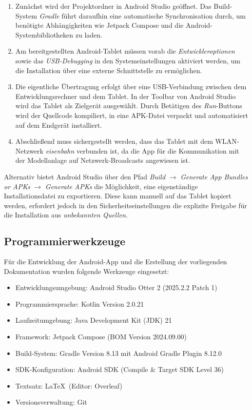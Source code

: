 \documentclass{article}
\begin{document}
\begin{enumerate}
    \item Zunächst wird der Projektordner in Android Studio geöffnet. Das Build-System \textit{Gradle} führt daraufhin eine automatische Synchronisation durch, um benötigte Abhängigkeiten wie Jetpack Compose und die Android-Systembibliotheken zu laden.
    
    \item Am bereitgestellten Android-Tablet müssen vorab die \textit{Entwickleroptionen} sowie das \textit{USB-Debugging} in den Systemeinstellungen aktiviert werden, um die Installation über eine externe Schnittstelle zu ermöglichen.
    
    \item Die eigentliche Übertragung erfolgt über eine USB-Verbindung zwischen dem Entwicklungsrechner und dem Tablet. In der Toolbar von Android Studio wird das Tablet als Zielgerät ausgewählt. Durch Betätigen des \textit{Run}-Buttons wird der Quellcode kompiliert, in eine APK-Datei verpackt und automatisiert auf dem Endgerät installiert.
    
    \item Abschließend muss sichergestellt werden, dass das Tablet mit dem WLAN-Netzwerk \textit{eisenbahn} verbunden ist, da die App für die Kommunikation mit der Modellanlage auf Netzwerk-Broadcasts angewiesen ist.
\end{enumerate}

Alternativ bietet Android Studio über den Pfad \textit{Build} $\rightarrow$ \textit{Generate App Bundles or APKs} $\rightarrow$ \textit{Generate APKs} die Möglichkeit, eine eigenständige Installationsdatei zu exportieren. Diese kann manuell auf das Tablet kopiert werden, erfordert jedoch in den Sicherheitseinstellungen die explizite Freigabe für die Installation aus \textit{unbekannten Quellen}.

\subsection{Programmierwerkzeuge}
Für die Entwicklung der Android-App und die Erstellung der vorliegenden Dokumentation wurden folgende Werkzeuge eingesetzt:

\begin{itemize}
    \item Entwicklungsumgebung: Android Studio Otter 2 (2025.2.2 Patch 1)
    \item Programmiersprache: Kotlin Version 2.0.21
    \item Laufzeitumgebung: Java Development Kit (JDK) 21
    \item Framework: Jetpack Compose (BOM Version 2024.09.00)
    \item Build-System: Gradle Version 8.13 mit Android Gradle Plugin 8.12.0
    \item SDK-Konfiguration: Android SDK (Compile \& Target SDK Level 36)
    \item Textsatz: \LaTeX\ (Editor: Overleaf)
    \item Versionsverwaltung: Git
\end{itemize}
\end{document}
